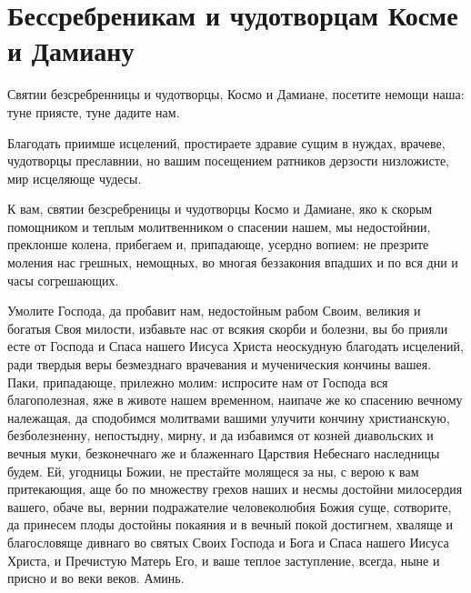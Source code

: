 \section{Бессребреникам и чудотворцам Косме и Дамиану}\begin{mymulticols}


Святии безсребренницы и чудотворцы, Космо и Дамиане, посетите немощи наша: туне приясте, туне дадите нам.


Благодать приимше исцелений, простираете здравие сущим в нуждах, врачеве, чудотворцы преславнии, но вашим посещением ратников дерзости низложисте, мир исцеляюще чудесы.


К вам, святии безсребреницы и чудотворцы Космо и Дамиане, яко к скорым помощником и теплым молитвенником о спасении нашем, мы недостойнии, преклонше колена, прибегаем и, припадающе, усердно вопием: не презрите моления нас грешных, немощных, во многая беззакония впадших и по вся дни и часы согрешающих. 

Умолите Господа, да пробавит нам, недостойным рабом Своим, великия и богатыя Своя милости, избавьте нас от всякия скорби и болезни, вы бо прияли есте от Господа и Спаса нашего Иисуса Христа неоскудную благодать исцелений, ради твердыя веры безмезднаго врачевания и мученическия кончины вашея. Паки, припадающе, прилежно молим: испросите нам от Господа вся благополезная, яже в животе нашем временном, наипаче же ко спасению вечному належащая, да сподобимся молитвами вашими улучити кончину христианскую, безболезненну, непостыдну, мирну, и да избавимся от козней диавольских и вечныя муки, безконечнаго же и блаженнаго Царствия Небеснаго наследницы будем. Ей, угодницы Божии, не престайте молящеся за ны, с верою к вам притекающия, аще бо по множеству грехов наших и несмы достойни милосердия вашего, обаче вы, вернии подражателие человеколюбия Божия суще, сотворите, да принесем плоды достойны покаяния и в вечный покой достигнем, хваляще и благословяще дивнаго во святых Своих Господа и Бога и Спаса нашего Иисуса Христа, и Пречистую Матерь Его, и ваше теплое заступление, всегда, ныне и присно и во веки веков. Аминь.

\end{mymulticols}

\mychapterending


